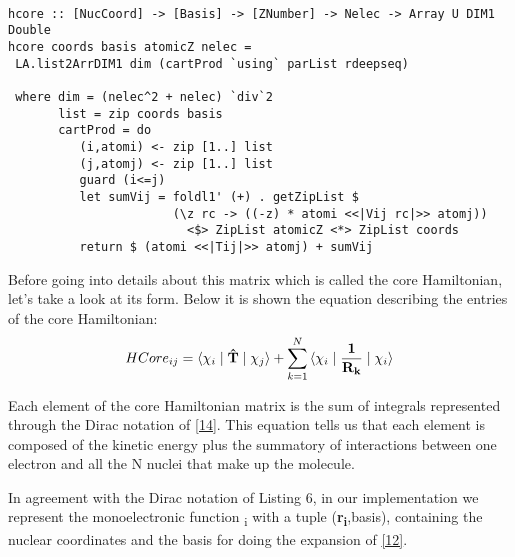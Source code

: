 \documentclass{tmr}
\begin{document}
\begin{lstlisting}[float,captionpos=b,belowcaptionskip=4pt, caption= Core Hamiltonian]

hcore :: [NucCoord] -> [Basis] -> [ZNumber] -> Nelec -> Array U DIM1 Double
hcore coords basis atomicZ nelec = 
 LA.list2ArrDIM1 dim (cartProd `using` parList rdeepseq)

 where dim = (nelec^2 + nelec) `div`2
       list = zip coords basis       
       cartProd = do
          (i,atomi) <- zip [1..] list
          (j,atomj) <- zip [1..] list
          guard (i<=j)
          let sumVij = foldl1' (+) . getZipList $
                       (\z rc -> ((-z) * atomi <<|Vij rc|>> atomj))
                         <$> ZipList atomicZ <*> ZipList coords
          return $ (atomi <<|Tij|>> atomj) + sumVij

\end{lstlisting}
 
\par Before going into details about this matrix which is called the
core Hamiltonian, let's take a look at its form. Below it is shown the equation
describing the entries of the core Hamiltonian:
\begin{equation}\label{16}
HCore_{ij} =\braket{\chi_{i} \mid \mathbf{\hat T} \mid \chi_{j}} + 
\sum_{k=1}^{N} \braket{\chi_{i} \mid \mathbf{\frac{1}{R_{k}}} \mid \chi_{i}} 
\end{equation}

Each element of the core Hamiltonian matrix is the sum of integrals represented through
the Dirac notation of \eqref{14}. This equation tells us that each element is composed
of the kinetic energy plus the summatory of interactions between one electron and all the N
nuclei that make up the molecule.

In agreement with the Dirac notation of Listing 6, in our implementation we represent the
monoelectronic function \textchi \textsubscript{i} with a tuple 
(\textbf{r\textsubscript{i}},basis), containing the nuclear coordinates 
and the basis for doing the expansion of \eqref{12}.
\end{document}
